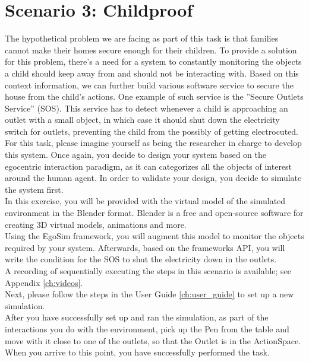 \section{Scenario 3: Childproof} %
\label{sec:eval_childproof_scenario}
The hypothetical problem we are facing as part of this task is that families cannot make their homes secure enough for their children. To provide a solution for this problem, there's a need for a system to constantly monitoring the objects a child should keep away from and should not be interacting with. Based on this context information, we can further build various software service to secure the house from the child's actions. One example of such service is the ''Secure Outlets Service'' (SOS). This service has to detect whenever a child is approaching an outlet with a small object, in which case it should shut down the electricity switch for outlets, preventing the child from the possibly of getting electrocuted.\\

For this task, please imagine yourself as being the researcher in charge to develop this system. Once again, you decide to design your system based on the egocentric interaction paradigm, as it can categorizes all the objects of interest around the human agent. In order to validate your design, you decide to simulate the system first.\\

In this exercise, you will be provided with the virtual model of the simulated environment in the Blender\cite{blender:online} format. Blender is a free and open-source software for creating 3D virtual models, animations and more.\\

Using the EgoSim framework, you will augment this model to monitor the objects required by your system. Afterwards, based on the frameworks API, you will write the condition for the SOS to shut the electricity down in the outlets.\\

A recording of sequentially executing the steps in this scenario is available; see Appendix \ref{ch:videos}.\\

Next, please follow the steps in the User Guide \ref{ch:user_guide} to set up a new simulation.\\

After you have successfully set up and ran the simulation, as part of the interactions you do with the environment, pick up the Pen from the table and move with it close to one of the outlets, so that the Outlet is in the ActionSpace. When you arrive to this point, you have successfully performed the task.\\
